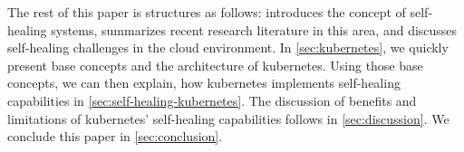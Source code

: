   The rest of this paper is structures as follows:
   introduces the concept of self-healing systems, summarizes recent research literature in this area, and discusses self-healing challenges in the cloud environment.
  In \cref{sec:kubernetes}, we quickly present base concepts and the architecture of \gls{kubernetes}.
  Using those base concepts, we can then explain, how \gls{kubernetes} implements self-healing capabilities in \cref{sec:self-healing-kubernetes}.
  The discussion of benefits and limitations of \gls{kubernetes}' self-healing capabilities follows in \cref{sec:discussion}.
  We conclude this paper in \cref{sec:conclusion}.
